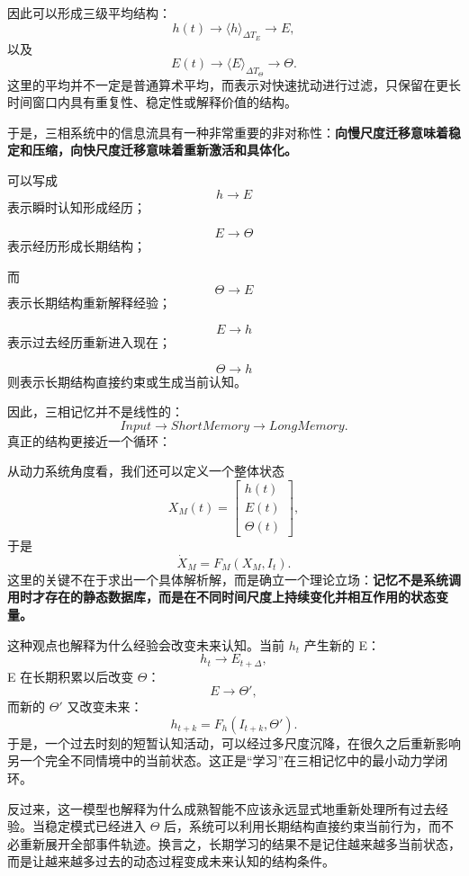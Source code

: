 因此可以形成三级平均结构：
\[
h(t)
\rightarrow
\langle h\rangle_{\Delta T_E}
\rightarrow
E,
\]
以及
\[
E(t)
\rightarrow
\langle E\rangle_{\Delta T_\Theta}
\rightarrow
\Theta.
\]
这里的平均并不一定是普通算术平均，而表示对快速扰动进行过滤，只保留在更长时间窗口内具有重复性、稳定性或解释价值的结构。

于是，三相系统中的信息流具有一种非常重要的非对称性：\textbf{向慢尺度迁移意味着稳定和压缩，向快尺度迁移意味着重新激活和具体化。}

可以写成
\[
h\rightarrow E
\]
表示瞬时认知形成经历；

\[
E\rightarrow\Theta
\]
表示经历形成长期结构；

而
\[
\Theta\rightarrow E
\]
表示长期结构重新解释经验；

\[
E\rightarrow h
\]
表示过去经历重新进入现在；

\[
\Theta\rightarrow h
\]
则表示长期结构直接约束或生成当前认知。

因此，三相记忆并不是线性的：
\[
Input\to ShortMemory\to LongMemory.
\]
真正的结构更接近一个循环：
\begin{statementbox}
\centering
{}
\end{statementbox}

从动力系统角度看，我们还可以定义一个整体状态
\[
X_M(t)
=
\begin{bmatrix}
h(t)\\
E(t)\\
\Theta(t)
\end{bmatrix},
\]
于是
\[
\dot X_M
=
F_M
\left(
X_M,I_t
\right).
\]
这里的关键不在于求出一个具体解析解，而是确立一个理论立场：\textbf{记忆不是系统调用时才存在的静态数据库，而是在不同时间尺度上持续变化并相互作用的状态变量。}

这种观点也解释为什么经验会改变未来认知。当前 $h_t$ 产生新的 E：
\[
h_t\rightarrow E_{t+\Delta},
\]
E 在长期积累以后改变 $\Theta$：
\[
E\rightarrow\Theta',
\]
而新的 $\Theta'$ 又改变未来：
\[
h_{t+k}
=
F_h
\left(
I_{t+k},\Theta'
\right).
\]
于是，一个过去时刻的短暂认知活动，可以经过多尺度沉降，在很久之后重新影响另一个完全不同情境中的当前状态。这正是“学习”在三相记忆中的最小动力学闭环。

反过来，这一模型也解释为什么成熟智能不应该永远显式地重新处理所有过去经验。当稳定模式已经进入 $\Theta$ 后，系统可以利用长期结构直接约束当前行为，而不必重新展开全部事件轨迹。换言之，长期学习的结果不是记住越来越多当前状态，而是让越来越多过去的动态过程变成未来认知的结构条件。

